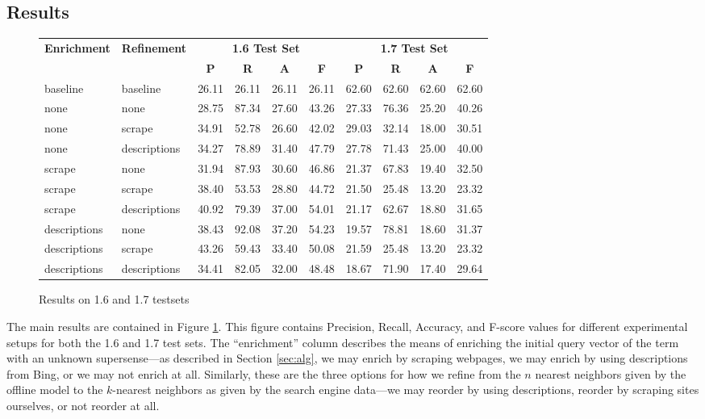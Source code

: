 \documentclass{article}
\begin{document}
\subsection{Results}
\begin{figure}[hbtp]
\begin{center}
\begin{tabular}{|l|l||c|c|c|c||c|c|c|c|}
\hline
\multirow{2}{*}{{\bf Enrichment}} & \multirow{2}{*}{{\bf Refinement}} & \multicolumn{4}{c||}{{\bf 1.6 Test Set}} & \multicolumn{4}{c|}{{\bf 1.7 Test Set}}  \\
\cline{3-10}
& & {\bf P} & {\bf R} & {\bf A} & {\bf F} & {\bf P} & {\bf R} & {\bf A} & {\bf F} \\
\hline \hline
baseline & baseline & 26.11 & 26.11 & 26.11 & 26.11 & 62.60 & 62.60 & 62.60 & 62.60 \\
\hline\hline
none & none & 28.75 & 87.34 & 27.60 & 43.26 & 27.33 & 76.36 & 25.20 & 40.26  \\
\hline
none & scrape & 34.91 & 52.78 & 26.60 & 42.02  & 29.03 & 32.14 & 18.00 & 30.51\\
\hline
none & descriptions & 34.27 & 78.89 & 31.40 & 47.79 &  27.78 & 71.43 & 25.00 & 40.00\\
\hline\hline
scrape & none & 31.94 & 87.93 & 30.60 & 46.86 & 21.37 & 67.83 & 19.40 & 32.50  \\
\hline
scrape & scrape & 38.40 & 53.53 & 28.80 & 44.72 & 21.50 & 25.48 & 13.20 & 23.32 \\
\hline
scrape & descriptions & 40.92 & 79.39 & 37.00 & 54.01  & 21.17 & 62.67 & 18.80 & 31.65  \\
\hline\hline
descriptions & none & 38.43 & 92.08 & 37.20 & 54.23 & 19.57 & 78.81 & 18.60 & 31.37  \\
\hline
descriptions & scrape & 43.26 & 59.43 & 33.40 & 50.08 & 21.59 & 25.48 & 13.20 & 23.32 \\
\hline
descriptions & descriptions & 34.41 & 82.05 & 32.00 & 48.48 & 18.67 & 71.90 & 17.40 & 29.64   \\
\hline
\end{tabular}
\caption{Results on 1.6 and 1.7 testsets}
\label{fig:res}
\end{center}
\end{figure}
The main results are contained in Figure \ref{fig:res}.
This figure contains Precision, Recall, Accuracy, and F-score values for different experimental setups for both the 1.6 and 1.7 test sets.
The ``enrichment'' column describes the means of enriching the initial query vector of the term with an unknown supersense---as described in Section \ref{sec:alg}, we may enrich by scraping webpages, we may enrich by using descriptions from Bing, or we may not enrich at all.
Similarly, these are the three options for how we refine from the $n$ nearest neighbors given by the offline model to the $k$-nearest neighbors as given by the search engine data---we may reorder by using descriptions, reorder by scraping sites ourselves, or not reorder at all.
\end{document}
